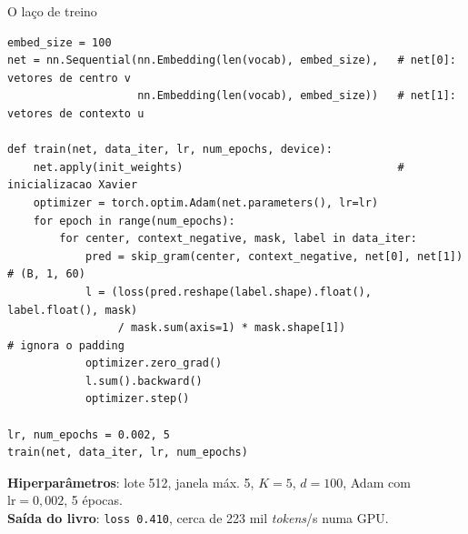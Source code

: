 \begin{frame}[fragile]{O laço de treino}
\vspace{-0.2cm}
\begin{lstlisting}[basicstyle=\ttfamily\fontsize{6.2}{7.0}\selectfont]
embed_size = 100
net = nn.Sequential(nn.Embedding(len(vocab), embed_size),   # net[0]: vetores de centro v
                    nn.Embedding(len(vocab), embed_size))   # net[1]: vetores de contexto u

def train(net, data_iter, lr, num_epochs, device):
    net.apply(init_weights)                                 # inicializacao Xavier
    optimizer = torch.optim.Adam(net.parameters(), lr=lr)
    for epoch in range(num_epochs):
        for center, context_negative, mask, label in data_iter:
            pred = skip_gram(center, context_negative, net[0], net[1])   # (B, 1, 60)
            l = (loss(pred.reshape(label.shape).float(), label.float(), mask)
                 / mask.sum(axis=1) * mask.shape[1])                     # ignora o padding
            optimizer.zero_grad()
            l.sum().backward()
            optimizer.step()

lr, num_epochs = 0.002, 5
train(net, data_iter, lr, num_epochs)
\end{lstlisting}
\vspace{-0.2cm}
\footnotesize
\textbf{Hiperparâmetros}: lote 512, janela máx. 5, $K = 5$, $d = 100$, Adam com $\text{lr} = 0{,}002$, 5 épocas.\\
\textbf{Saída do livro}: {\color{dexpiGreenDark}\texttt{loss 0.410}}, cerca de 223 mil \textit{tokens}/s numa GPU.

\end{frame}
